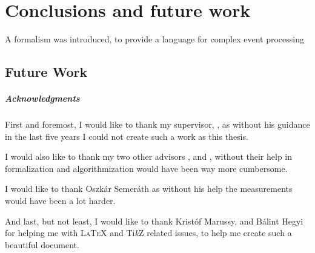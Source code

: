 \chapter{Conclusions and future work}

A formalism was introduced, to provide a language for complex event processing



\section{Future Work}

\paragraph*{Acknowledgments}
{}


First and foremost, I would like to thank my supervisor, \advisori, as without his guidance in the last five years I could not create such a work as this thesis.

I would also like to thank my two other advisors \advisorii, and \advisoriii, without their help in formalization and algorithmization would have been way more cumbersome.

I would like to thank Oszkár Semeráth as without his help the measurements would have been a lot harder.

And last, but not least, I would like to thank Kristóf Marussy, and Bálint Hegyi for helping me with L\textsc{a}T\textsc{e}X and Ti\emph{k}Z related issues, to help me create such a beautiful document.

